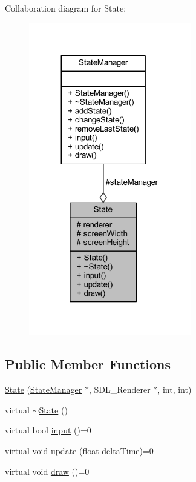 Collaboration diagram for State\+:\nopagebreak
\begin{figure}[H]
\begin{center}
\leavevmode
\includegraphics[width=200pt]{class_state__coll__graph}
\end{center}
\end{figure}
\subsection*{Public Member Functions}
\begin{DoxyCompactItemize}
\item 
\hyperlink{class_state_a68fb4089a66325a22f15311356e9df87}{State} (\hyperlink{class_state_manager}{State\+Manager} $\ast$, S\+D\+L\+\_\+\+Renderer $\ast$, int, int)
\item 
virtual \hyperlink{class_state_afab438d92b90dc18d194dbd9c9c8bab3}{$\sim$\+State} ()
\item 
virtual bool \hyperlink{class_state_ac0dcfe3db8d012b37e6935f4f805ece7}{input} ()=0
\item 
virtual void \hyperlink{class_state_a8f582ba039a10fff9712b6a21ef22808}{update} (float delta\+Time)=0
\item 
virtual void \hyperlink{class_state_ae261605bc40b7e3959ce5df5457e4942}{draw} ()=0
\end{DoxyCompactItemize}

